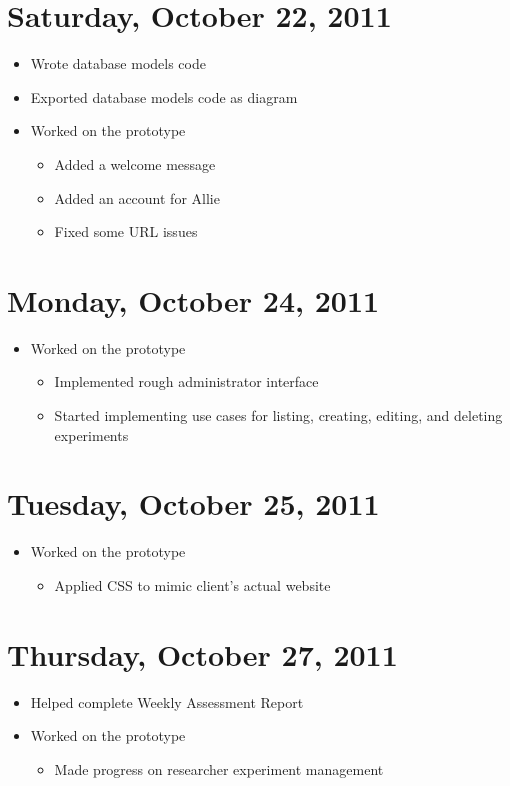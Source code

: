 \documentclass{article}
\begin{document}
\section{Saturday, October 22, 2011}
\begin{itemize}
\item Wrote database models code
\item Exported database models code as diagram
\item Worked on the prototype
    \begin{itemize}
    \item Added a welcome message
    \item Added an account for Allie
    \item Fixed some URL issues
    \end{itemize}
\end{itemize}

\section{Monday, October 24, 2011}
\begin{itemize}
\item Worked on the prototype
    \begin{itemize}
    \item Implemented rough administrator interface
    \item Started implementing use cases for listing, creating, editing, and deleting experiments
    \end{itemize}
\end{itemize}

\section{Tuesday, October 25, 2011}
\begin{itemize}
\item Worked on the prototype
    \begin{itemize}
    \item Applied CSS to mimic client's actual website
    \end{itemize}
\end{itemize}

\section{Thursday, October 27, 2011}
\begin{itemize}
\item Helped complete Weekly Assessment Report
\item Worked on the prototype
    \begin{itemize}
    \item Made progress on researcher experiment management
    \end{itemize}
\end{itemize}
\end{document}
